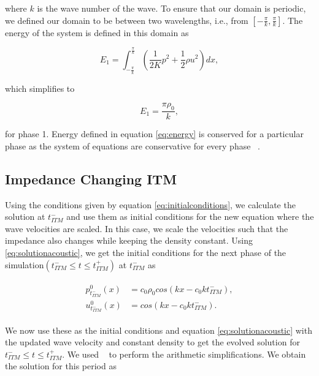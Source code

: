 where $k$ is the wave number of the wave. To ensure that our domain is periodic, we defined our domain to be between two wavelengths, i.e., from 
$\left[-\frac{\pi}{k}, \frac{\pi}{k}\right]$. The energy of the system is defined in this domain as ~\parencite{Kopriva2021}

\begin{equation}
     E_1 = \int_{-\frac{\pi}{k}}^{\frac{\pi}{k}} \left(\frac{1}{2K}p^2 + \frac{1}{2}\rho u^2\right) dx,
    \label{eq:energy}
\end{equation}

which simplifies to 

\begin{equation}
    E_1 = \frac{\pi\rho_0}{k},
\end{equation}

for phase 1. Energy defined in equation \ref{eq:energy} is conserved for a particular phase as the system of equations are conservative for every phase ~\parencite{Kopriva2021}. 

\subsection{Impedance Changing \ac{ITM}}\label{section:impedancechangingITM}
Using the conditions given by equation \ref{eq:initialconditions}, we calculate the solution at $t_{ITM}^-$ and use them as initial conditions for the new equation where the wave velocities are scaled.
In this case, we scale the velocities such that the impedance also changes while keeping the density constant. Using \ref{eq:solutionacoustic}, we get the initial conditions for the next phase of the simulation$\left(t_{ITM}^- \leq t \leq t_{ITM}^+ \right)$ at $t_{ITM}^-$ as

\begin{align}
    \begin{split}
        p^0_{t_{ITM}^-}\left(x\right) &= c_0 \rho_0 cos\left(kx - c_0kt_{ITM}^-\right), \\
        u^0_{t_{ITM}^-}\left(x\right) &= cos\left(kx - c_0kt_{ITM}^-\right) .
    \end{split}
\end{align}

We now use these as the initial conditions and equation \ref{eq:solutionacoustic} with the updated wave velocity and constant density to get the evolved solution for $t_{ITM}^- \leq t \leq t_{ITM}^+ $. We used ~\parencite{sagemath} to perform the arithmetic simplifications. We obtain the solution for this period as

